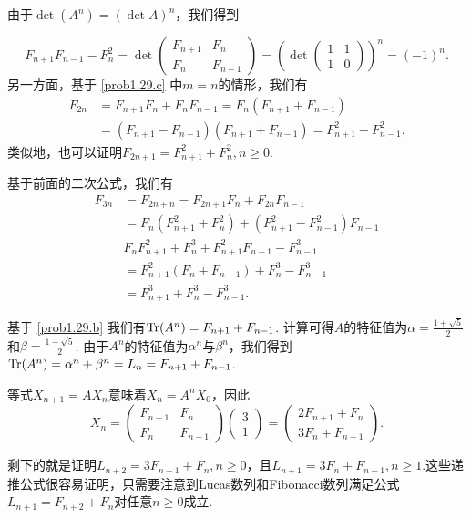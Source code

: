 \begin{solution}
  \begin{enuma}\setcounter{enumi}{3}
    \item 由于$\det(A^n)=(\det A)^n$，我们得到
  \end{enuma}
  \[
    F_{n+1}F_{n-1} - F_n^2 = \det\begin{pmatrix}
      F_{n+1} & F_n \\
      F_n & F_{n-1}
    \end{pmatrix} = \left(
      \det \begin{pmatrix}
        1 & 1 \\
        1 & 0
      \end{pmatrix}
    \right)^n = (-1)^n.
  \]
  另一方面，基于 \ref{prob1.29.c} 中$m=n$的情形，我们有
  \begin{align*}
    F_{2n} & = F_{n+1}F_n + F_nF_{n-1} =
        F_n (F_{n+1} + F_{n-1}) \\
        & = (F_{n+1}-F_{n-1}) (F_{n+1} + F_{n-1})
          = F_{n+1}^2 - F_{n-1}^2.
  \end{align*}
  类似地，也可以证明$F_{2n+1}=F_{n+1}^2+F_n^2,n\ge0$.

  基于前面的二次公式，我们有
  \begin{align*}
    F_{3n} & = F_{2n+n} = F_{2n+1}F_n + F_{2n}F_{n-1} \\
    & = F_n (F_{n+1}^2+F_n^2) + (F_{n+1}^2 - F_{n-1}^2) F_{n-1} \\
    & F_nF_{n+1}^2 + F_n^3 + F_{n+1}^2F_{n-1} - F_{n-1}^3 \\
    & = F_{n+1}^2 (F_n + F_{n-1}) + F_n^3 - F_{n-1}^3 \\
    & = F_{n+1}^3 + F_n^3 - F_{n-1}^3.
  \end{align*}

  \begin{enuma}\setcounter{enumi}{4}
    \item 基于 \ref{prob1.29.b} 我们有$\operatorname{Tr}(A^n)=F_{n+1}+F_{n-1}$. 计算可得$A$的特征值为$\alpha=\frac{1+\sqrt5}2$和$\beta=\frac{1-\sqrt5}2$. 由于$A^n$的特征值为$\alpha^n$与$\beta^n$，我们得到$\operatorname{Tr}(A^n)=\alpha^n+\beta^n=L_n=F_{n+1}+F_{n-1}$.
  \end{enuma}

  等式$X_{n+1}=AX_n$意味着$X_n=A^nX_0$，因此
  \[
    X_n = \begin{pmatrix}
      F_{n+1} & F_n \\
      F_n & F_{n-1}
    \end{pmatrix} \begin{pmatrix}
      3 \\ 1
    \end{pmatrix} = \begin{pmatrix}
      2F_{n+1} + F_n \\
      3F_n + F_{n-1}
    \end{pmatrix}.
  \]

  剩下的就是证明$L_{n+2}=3F_{n+1}+F_n,n\ge0$，且$L_{n+1}=3F_n+F_{n-1},n\ge1$.这些递推公式很容易证明，只需要注意到Lucas数列和Fibonacci数列满足公式$L_{n+1}=F_{n+2}+F_n$对任意$n\ge0$成立.
\end{solution}


